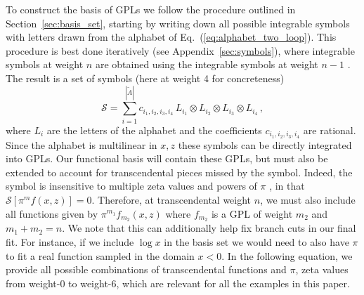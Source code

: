 \documentclass[a4paper,11pt]{article}
\begin{document}
To construct the basis of GPLs we follow the procedure outlined in Section~\ref{sec:basis_set}, starting by writing down all possible integrable symbols with letters drawn from the alphabet of Eq.~(\ref{eq:alphabet_two_loop}). This procedure is best done iteratively (see Appendix~\ref{sec:symbols}), where integrable symbols at weight $n$ are obtained using the integrable symbols at weight $n-1$ \cite{Chavez:2012kn, Hannesdottir:2024hke}. The result is a set of symbols (here at weight 4 for concreteness)
\begin{equation} \label{eq:symbol_weight4}
    \mathcal{S} = \sum_{i=1}^{|\tilde{A}|}  c_{i_1,i_2,i_3,i_4} \, L_{i_1} \otimes L_{i_2} \otimes L_{i_3} \otimes L_{i_4} \,,
\end{equation}
where $L_i$ are the letters of the alphabet and the coefficients $c_{i_1,i_2,i_3,i_4}$ are rational. Since the alphabet is multilinear in $x,z$ these symbols can be directly integrated into GPLs. Our functional basis will  contain these GPLs, but must also be extended to account for transcendental pieces missed by the symbol. Indeed, the symbol is insensitive to multiple zeta values and powers of $\pi$ , in that $\mathcal{S}[\pi^m f(x,z)]=0$. Therefore, at transcendental weight $n$, we must also include all functions given by $\pi^{m_1} f_{m_2}(x,z)$ where $f_{m_2}$ is a GPL of weight $m_2$ and $m_1+m_2=n$. We note that this can additionally help fix branch cuts in our final fit. For instance, if we include $\log x$ in the basis set we would need to also have $\pi$ to fit a real function sampled in the domain $x<0$. In the following equation, we provide all possible combinations of transcendental functions and $\pi$, zeta values from weight-$0$ to weight-$6$, which are relevant for all the examples in this paper. 
\end{document}
